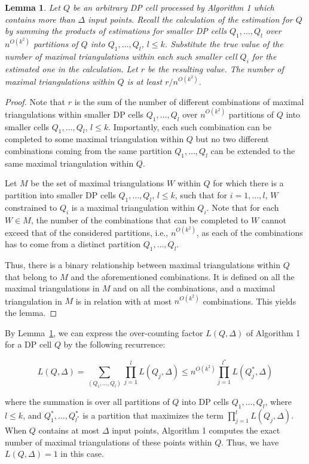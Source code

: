 \documentclass[a4paper]{article}
\newtheorem{lemma}{Lemma}
\begin{document}
\begin{lemma}\label{lem: over1}
Let $Q$ be an arbitrary DP cell 
processed by Algorithm 1 which
contains more than $\Delta$ input points.
Recall the calculation of the estimation for
$Q$ by summing the products of estimations
for smaller DP cells $Q_1,\dots,Q_l$ over $n^{O(k^2)}$ partitions
of $Q$ into $Q_1,\dots,Q_l$, $l\le k$.
Substitute the true value of
the number of maximal triangulations within 
each such smaller cell $Q_i$ for the estimated one
in the calculation.
Let $r$ be the resulting value. The
number of maximal triangulations within
$Q$ is at least $r/n^{O(k^2)}$.
\end{lemma}
\begin{proof}
Note that $r$ is the sum of the number
of different combinations  
of maximal triangulations within  
smaller DP cells $Q_1,\dots,Q_l$
over $n^{O(k^2)}$ partitions of
$Q$ into smaller cells $Q_1,\dots,Q_l$, 
$l\le k$. Importantly, each
such combination can be completed
to some maximal triangulation within $Q$
but no two different combinations coming
from the same partition $Q_1,\dots,Q_l$
can be extended to the same maximal triangulation
within $Q$.

Let $M$ be the set of maximal triangulations $W$
within $Q$ for which there is a partition
into smaller DP cells $Q_1,\dots,Q_l$, $l\le k$,
such that for $i=1,\dots,l$, $W$ constrained
to $Q_i$ is a maximal triangulation within $Q_i$.
Note that for each $W\in M$, the number of the combinations
that can be completed to $W$  cannot exceed that
of the considered partitions, i.e., $n^{O(k^2)}$,
as each of the combinations has to come
from a distinct partition $Q_1,\dots,Q_l$.

Thus, there is a binary relationship between
maximal triangulations within $Q$ that
belong to $M$ and the aforementioned
combinations. It is defined on all the
maximal triangulations in $M$ and on all the combinations,
and a maximal triangulation in $M$
is in relation with at most $n^{O(k^2)}$ combinations.
This yields the lemma.
\end{proof}

By Lemma~\ref{lem: over1}, we can express the over-counting
factor $L(Q,\Delta)$ of Algorithm 1 for 
a DP cell $Q$ 
by the following recurrence:

$$L(Q,\Delta)=\sum_{(Q_1,\dots,Q_l)} \prod_{j=1}^lL(Q_j,\Delta)\le
n^{O(k^2)} \prod_{j=1}^{l^*}L(Q_j^*,\Delta)$$

where the summation is over all partitions of $Q$ into
DP cells $Q_1,\dots,Q_l$, where $l\le k$, 
and $Q^*_1,\dots,Q^*_{l^*}$ is a partition
that maximizes the term $\prod_{j=1}^lL(Q_j,\Delta)$.
When $Q$ contains at most $\Delta$ input points,
Algorithm 1 computes the exact number of maximal
triangulations of these points within $Q$. Thus, we have
$L(Q,\Delta)=1$  in this case.
\end{document}
